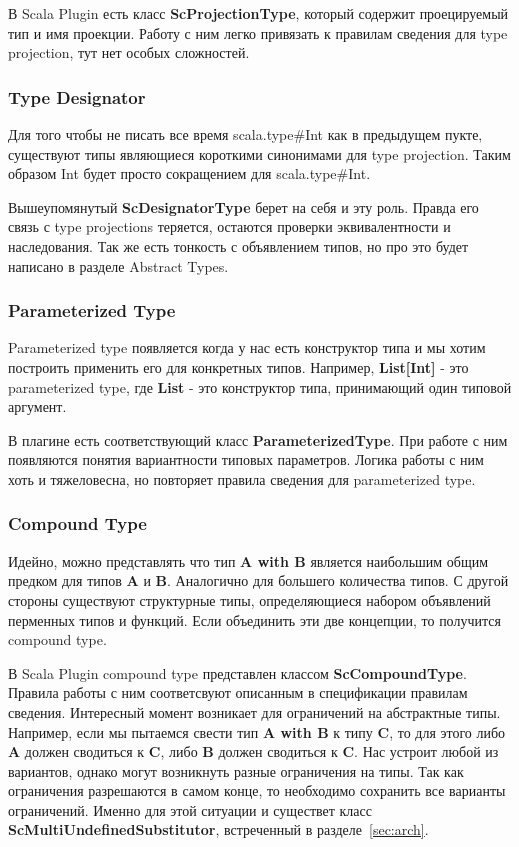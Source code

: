 В Scala Plugin есть класс \textbf{ScProjectionType}, который содержит
проецируемый тип и имя проекции.
Работу с ним легко привязать к правилам сведения для type projection,
тут нет особых сложностей.

\subsubsection{Type Designator}
Для того чтобы не писать все время scala.type\#Int как в предыдущем пукте,
существуют типы являющиеся короткими синонимами для type projection.
Таким образом Int будет просто сокращением для scala.type\#Int.

Вышеупомянутый \textbf{ScDesignatorType} берет на себя и эту роль.
Правда его связь с type projections теряется, остаются проверки эквивалентности
и наследования.
Так же есть тонкость с объявлением типов, но про это будет написано в разделе
Abstract Types.

\subsubsection{Parameterized Type}
Parameterized type появляется когда у нас есть конструктор типа и мы хотим
построить применить его для конкретных типов.
Например, \textbf{List[Int]} - это parameterized type,
где \textbf{List} - это конструктор типа, принимающий один типовой
аргумент.

В плагине есть соответствующий класс \textbf{ParameterizedType}.
При работе с ним появляются понятия вариантности типовых параметров.
Логика работы с ним хоть и тяжеловесна, но повторяет правила сведения для
parameterized type.

\subsubsection{Compound Type}
Идейно, можно представлять что тип \textbf{A with B} является наибольшим
общим предком для типов \textbf{A} и \textbf{B}.
Аналогично для большего количества типов.
С другой стороны существуют структурные типы, определяющиеся набором объявлений
перменных типов и функций.
Если объединить эти две концепции, то получится compound type.

В Scala Plugin compound type представлен классом \textbf{ScCompoundType}.
Правила работы с ним соответсвуют описанным в спецификации правилам сведения.
Интересный момент возникает для ограничений на абстрактные типы.
Например, если мы пытаемся свести тип \textbf{A with B} к типу \textbf{C},
то для этого либо \textbf{A} должен сводиться к \textbf{C}, либо \textbf{B}
должен сводиться к \textbf{C}.
Нас устроит любой из вариантов, однако могут возникнуть разные ограничения на
типы.
Так как ограничения разрешаются в самом конце, то необходимо сохранить все
варианты ограничений.
Именно для этой ситуации и существет класс \textbf{ScMultiUndefinedSubstitutor},
встреченный в разделе~\ref{sec:arch}.

